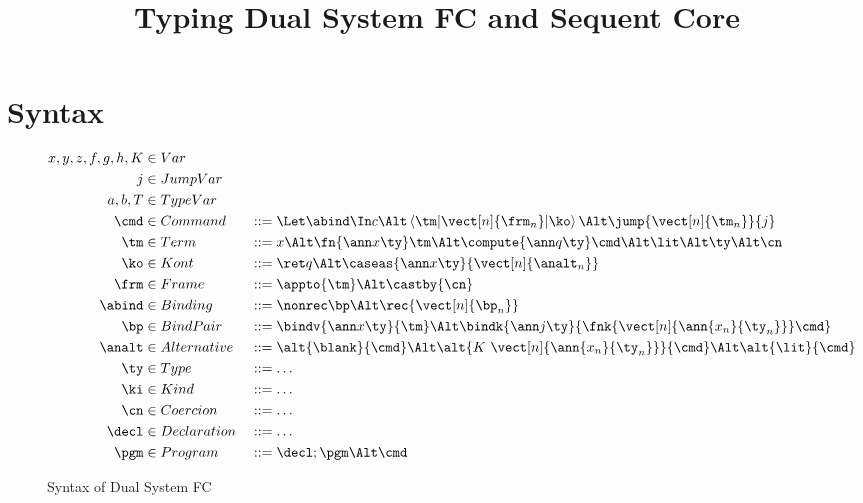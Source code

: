 \documentclass{article}
\begin{document}
\title{Typing Dual System FC and Sequent Core}

\maketitle

\section{Syntax}
\label{sec:syntax}

\begin{figure}[h]
\centering
\begin{gather*}
\begin{aligned}
  x, y, z, f, g, h, K &\in Var
  \\
  j &\in JumpVar
  \\
  a, b, T &\in TypeVar
  \\
  \cmd &\in Command
  &
  &::= \Let \abind \In c
  \Alt \braket{\tm | \vect[n]{\frm_n} | \ko}
  \Alt \jump{\vect[n]{\tm_n}}{j}
  \\
  \tm &\in Term
  &
  &::= x
  \Alt \fn{\ann x \ty} \tm
  \Alt \compute{\ann q \ty} \cmd
  \Alt \lit
  \Alt \ty
  \Alt \cn
  \\
  \ko &\in Kont
  &
  &::= \ret q
  \Alt \caseas{\ann x \ty}{\vect[n]{\analt_n}}
  \\
  \frm &\in Frame
  &
  &::= \appto{\tm} \Alt \castby{\cn}
  \\
  \abind &\in Binding
  &
  &::= \nonrec \bp
  \Alt \rec{\vect[n]{\bp_n}}
  \\
  \bp &\in BindPair
  &
  &::= \bindv{\ann x \ty}{\tm}
  \Alt \bindk{\ann j \ty}{\fnk{\vect[n]{\ann{x_n}{\ty_n}}}\cmd}
  \\
  \analt &\in Alternative
  &
  &::= \alt{\blank}{\cmd}
  \Alt \alt{K ~ \vect[n]{\ann{x_n}{\ty_n}}}{\cmd}
  \Alt \alt{\lit}{\cmd}
  \\
  \ty &\in Type
  &
  &::= \dots
  \\
  \ki &\in Kind
  &
  &::= \dots
  \\
  \cn &\in Coercion
  &
  &::= \dots
  \\
  \decl &\in Declaration
  &
  &::= \dots
  \\
  \pgm &\in Program
  &
  &::= \decl; \pgm
  \Alt \cmd
\end{aligned}
\end{gather*}
\caption{Syntax of Dual System FC}
\label{fig:dual-fc-syntax}
\end{figure}
\end{document}
